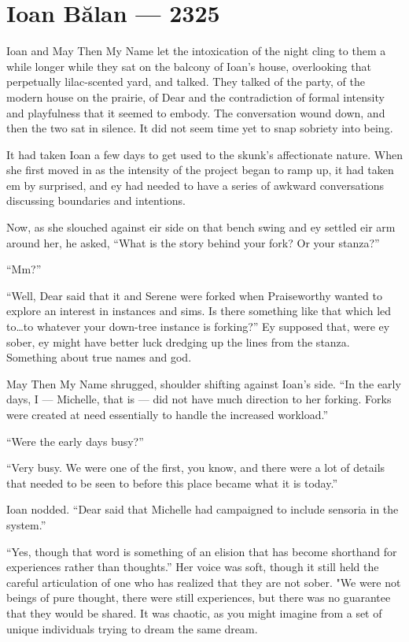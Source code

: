 \hypertarget{ioan-bux103lan-2325}{%
\chapter{Ioan Bălan — 2325}\label{ioan-bux103lan-2325}}

Ioan and May Then My Name let the intoxication of the night cling to them a while longer while they sat on the balcony of Ioan's house, overlooking that perpetually lilac-scented yard, and talked. They talked of the party, of the modern house on the prairie, of Dear and the contradiction of formal intensity and playfulness that it seemed to embody. The conversation wound down, and then the two sat in silence. It did not seem time yet to snap sobriety into being.

It had taken Ioan a few days to get used to the skunk's affectionate nature. When she first moved in as the intensity of the project began to ramp up, it had taken em by surprised, and ey had needed to have a series of awkward conversations discussing boundaries and intentions.

Now, as she slouched against eir side on that bench swing and ey settled eir arm around her, he asked, ``What is the story behind your fork? Or your stanza?''

``Mm?''

``Well, Dear said that it and Serene were forked when Praiseworthy wanted to explore an interest in instances and sims. Is there something like that which led to\ldots to whatever your down-tree instance is forking?'' Ey supposed that, were ey sober, ey might have better luck dredging up the lines from the stanza. Something about true names and god.

May Then My Name shrugged, shoulder shifting against Ioan's side. ``In the early days, I — Michelle, that is — did not have much direction to her forking. Forks were created at need essentially to handle the increased workload.''

``Were the early days busy?''

``Very busy. We were one of the first, you know, and there were a lot of details that needed to be seen to before this place became what it is today.''

Ioan nodded. ``Dear said that Michelle had campaigned to include sensoria in the system.''

``Yes, though that word is something of an elision that has become shorthand for experiences rather than thoughts.'' Her voice was soft, though it still held the careful articulation of one who has realized that they are not sober. "We were not beings of pure thought, there were still experiences, but there was no guarantee that they would be shared. It was chaotic, as you might imagine from a set of unique individuals trying to dream the same dream.

